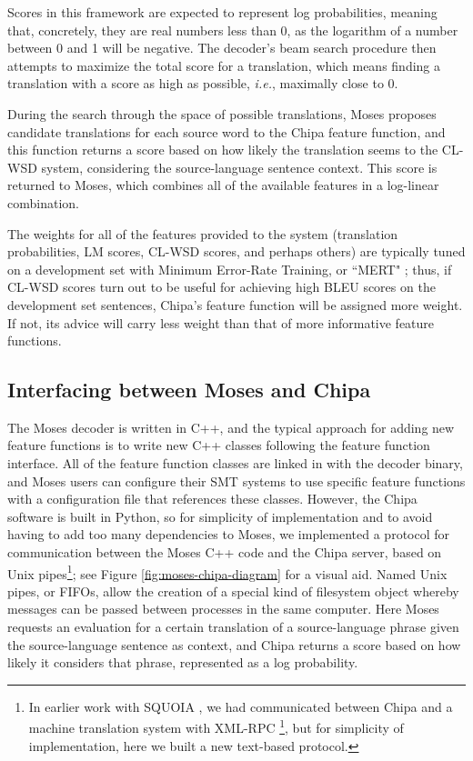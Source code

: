 Scores in this framework are expected to represent log probabilities, meaning
that, concretely, they are real numbers less than 0, as the logarithm of a
number between 0 and 1 will be negative. The decoder's beam search procedure
then attempts to maximize the total score for a translation, which means
finding a translation with a score as high as possible, \emph{i.e.}, maximally
close to 0.

During the search through the space of possible translations, Moses proposes
candidate translations for each source word to the Chipa feature function, and
this function returns a score based on how likely the translation seems to the
CL-WSD system, considering the source-language sentence context. This score is
returned to Moses, which combines all of the available features in a log-linear
combination.

The weights for all of the features provided to the system (translation
probabilities, LM scores, CL-WSD scores, and perhaps others) are typically
tuned on a development set with Minimum Error-Rate Training, or ``MERT"
\cite{och:2003:ACL}; thus, if CL-WSD scores turn out to be useful for achieving
high BLEU scores on the development set sentences, Chipa's feature function
will be assigned more weight. If not, its advice will carry less weight than
that of more informative feature functions.

\subsection{Interfacing between Moses and Chipa}
The Moses decoder is written in C++, and the typical approach for adding new
feature functions is to write new C++ classes following the feature function
interface. All of the feature function classes are linked in with the decoder
binary, and Moses users can configure their SMT systems to use specific feature
functions with a configuration file that references these classes. However, the
Chipa software is built in Python, so for simplicity of implementation and to
avoid having to add too many dependencies to Moses, we implemented a protocol
for communication between the Moses C++ code and the Chipa server, based on
Unix pipes\footnote{In earlier work with SQUOIA \cite{rudnick:saltmil2014}, we
had communicated between Chipa and a machine translation system with XML-RPC
\footnote{\url{http://xmlrpc.scripting.com/}}, but for simplicity of
implementation, here we built a new text-based protocol.}; see Figure
\ref{fig:moses-chipa-diagram} for a visual aid. Named Unix pipes, or FIFOs,
allow the creation of a special kind of filesystem object whereby messages can
be passed between processes in the same computer. Here Moses requests an
evaluation for a certain translation of a source-language phrase given the
source-language sentence as context, and Chipa returns a score based on how
likely it considers that phrase, represented as a log probability.

